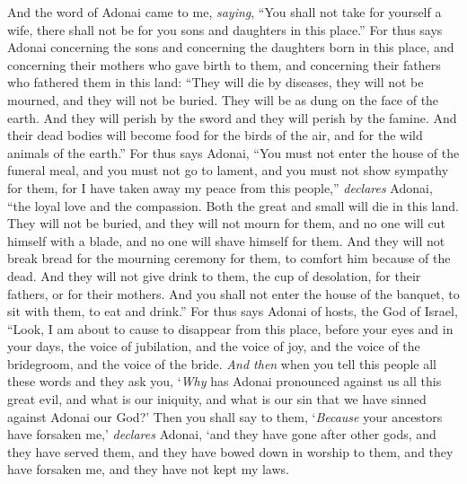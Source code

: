 \begin{biblechapter} %
 And the word of Adonai came to me, \textit{saying},
\verse “You shall not take for yourself a wife, there shall not be for you sons and daughters in this place.”
\verse For thus says Adonai concerning the sons and concerning the daughters born in this place, and concerning their mothers who gave birth to them, and concerning their fathers who fathered them in this land:
\verse “They will die by diseases, they will not be mourned, and they will not be buried. They will be as dung on the face of the earth. And they will perish by the sword and they will perish by the famine. And their dead bodies will become food for the birds of the air, and for the wild animals of the earth.”
\verse For thus says Adonai, “You must not enter the house of the funeral meal, and you must not go to lament, and you must not show sympathy for them, for I have taken away my peace from this people,” \textit{declares} Adonai, “the loyal love and the compassion.
\verse Both the great and small will die in this land. They will not be buried, and they will not mourn for them, and no one will cut himself with a blade, and no one will shave himself for them.
\verse And they will not break bread for the mourning ceremony for them, to comfort him because of the dead. And they will not give drink to them, the cup of desolation, for their fathers, or for their mothers.
\verse And you shall not enter the house of the banquet, to sit with them, to eat and drink.”
\verse For thus says Adonai of hosts, the God of Israel, “Look, I am about to cause to disappear from this place, before your eyes and in your days, the voice of jubilation, and the voice of joy, and the voice of the bridegroom, and the voice of the bride.
\verse \textit{And then} when you tell this people all these words and they ask you, ‘\textit{Why} has Adonai pronounced against us all this great evil, and what is our iniquity, and what is our sin that we have sinned against Adonai our God?’
\verse Then you shall say to them, ‘\textit{Because} your ancestors have forsaken me,’ \textit{declares} Adonai, ‘and they have gone after other gods, and they have served them, and they have bowed down in worship to them, and they have forsaken me, and they have not kept my laws.

\end{biblechapter}
